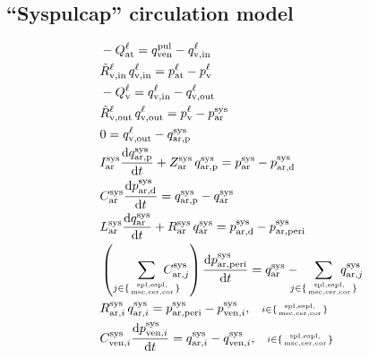 \documentclass[a4paper,12pt]{report}
\begin{document}
\subsection{``Syspulcap'' circulation model}

\begin{align}
&-Q_{\mathrm{at}}^{\ell} = q_{\mathrm{ven}}^{\mathrm{pul}} - q_{\mathrm{v,in}}^{\ell}\nonumber\\
&\tilde{R}_{\mathrm{v,in}}^{\ell}\,q_{\mathrm{v,in}}^{\ell} = p_{\mathrm{at}}^{\ell}-p_{\mathrm{v}}^{\ell}\nonumber\\
&-Q_{\mathrm{v}}^{\ell} = q_{\mathrm{v,in}}^{\ell} - q_{\mathrm{v,out}}^{\ell}\nonumber\\
&\tilde{R}_{\mathrm{v,out}}^{\ell}\,q_{\mathrm{v,out}}^{\ell} = p_{\mathrm{v}}^{\ell}-p_{\mathrm{ar}}^{\mathrm{sys}}\nonumber\\
&0 = q_{\mathrm{v,out}}^{\ell} - q_{\mathrm{ar,p}}^{\mathrm{sys}}\nonumber\\
&I_{\mathrm{ar}}^{\mathrm{sys}} \frac{\mathrm{d}q_{\mathrm{ar,p}}^{\mathrm{sys}}}{\mathrm{d}t} + Z_{\mathrm{ar}}^{\mathrm{sys}}\,q_{\mathrm{ar,p}}^{\mathrm{sys}}=p_{\mathrm{ar}}^{\mathrm{sys}}-p_{\mathrm{ar,d}}^{\mathrm{sys}}\nonumber\\
&C_{\mathrm{ar}}^{\mathrm{sys}} \frac{\mathrm{d}p_{\mathrm{ar,d}}^{\mathrm{sys}}}{\mathrm{d}t} = q_{\mathrm{ar,p}}^{\mathrm{sys}} - q_{\mathrm{ar}}^{\mathrm{sys}}\nonumber\\
&L_{\mathrm{ar}}^{\mathrm{sys}}\frac{\mathrm{d}q_{\mathrm{ar}}^{\mathrm{sys}}}{\mathrm{d}t} + R_{\mathrm{ar}}^{\mathrm{sys}}\,q_{\mathrm{ar}}^{\mathrm{sys}}=p_{\mathrm{ar,d}}^{\mathrm{sys}} -p_{\mathrm{ar,peri}}^{\mathrm{sys}}\nonumber\\
&\left(\sum_{j\in\{\mathrm{spl,espl,\atop msc,cer,cor}\}}\!\!\!\!\!\!\!\!\!C_{\mathrm{ar},j}^{\mathrm{sys}}\right) \frac{\mathrm{d}p_{\mathrm{ar,peri}}^{\mathrm{sys}}}{\mathrm{d}t} = q_{\mathrm{ar}}^{\mathrm{sys}}-\!\!\!\!\!\sum_{j\in\{\mathrm{spl,espl,\atop msc,cer,cor}\}}\!\!\!\!\!\!\!\!\!q_{\mathrm{ar},j}^{\mathrm{sys}}\nonumber\\
&R_{\mathrm{ar},i}^{\mathrm{sys}}\,q_{\mathrm{ar},i}^{\mathrm{sys}} = p_{\mathrm{ar,peri}}^{\mathrm{sys}} - p_{\mathrm{ven},i}^{\mathrm{sys}}, \quad\scriptstyle{i\in\{\mathrm{spl,espl,\atop msc,cer,cor}\}}\nonumber\\
&C_{\mathrm{ven},i}^{\mathrm{sys}} \frac{\mathrm{d}p_{\mathrm{ven},i}^{\mathrm{sys}}}{\mathrm{d}t} = q_{\mathrm{ar},i}^{\mathrm{sys}} - q_{\mathrm{ven},i}^{\mathrm{sys}}, \quad\scriptstyle{i\in\{\mathrm{spl,espl,\atop msc,cer,cor}\}}\nonumber\\

\end{align}
\end{document}

